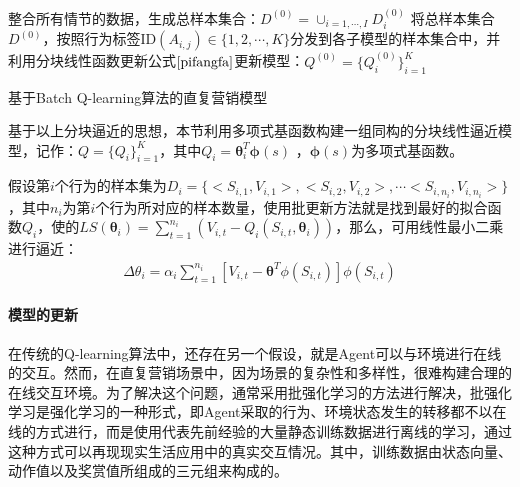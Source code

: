 \begin{algorithm}[htbp]
\small
\SetAlgoLined
{} 

整合所有情节的数据，生成总样本集合：$D^{(0)}=\cup_{i=1,\cdots,I} D_{i}^{(0)}$\;
将总样本集合$D^{(0)}$，按照行为标签ID$(A_{i,j}) \in \{1,2,\cdots, K \}$分发到各子模型的样本集合中，并利用分块线性函数更新公式$\eqref{pifangfa}$更新模型：$Q^{(0)}=\{Q_{i}^{(0)}\}_{i=1}^{K}$\;
\caption{基于Batch Q-learning算法的直复营销模型}
\label{algo:SVR+Q}
\end{algorithm}

基于以上分块逼近的思想，本节利用多项式基函数构建一组同构的分块线性逼近模型，记作：$Q=\{Q_{i}\}_{i=1}^{K}$，其中$Q_{i}=\bm{\theta}_{i}^{T} \bm{\phi}(s)$ ，$\bm{\phi}(s)$为多项式基函数。

假设第$i$个行为的样本集为$D_{i}=\{<S_{i,1},V_{i,1}>, <S_{i,2}, V_{i,2}>, \cdots <S_{i,n_{i}},V_{i,n_{i}}>\}$，其中$n_{i}$为第$i$个行为所对应的样本数量，使用批更新方法就是找到最好的拟合函数$Q_{i}$，使的$LS(\bm{\theta}_{i})=\sum_{t=1}^{n_{i}}(V_{i,t}-Q_{i}(S_{i,t},\bm{\theta}_{i}))$，那么，可用线性最小二乘进行逼近：
\begin{equation}\label{pifangfa}
\begin{aligned}
\Delta \theta_{i} = \alpha_{i} \sum_{t=1}^{n_{i}}[V_{i,t}-\bm{\theta}^{T} \phi(S_{i,t})] \phi(S_{i,t})
\end{aligned}
\end{equation}

\paragraph{模型的更新}
在传统的Q-learning算法中，还存在另一个假设，就是Agent可以与环境进行在线的交互。然而，在直复营销场景中，因为场景的复杂性和多样性，很难构建合理的在线交互环境。为了解决这个问题，通常采用批强化学习\citep{lange2012batch}的方法进行解决，批强化学习是强化学习的一种形式，即Agent采取的行为、环境状态发生的转移都不以在线的方式进行，而是使用代表先前经验的大量静态训练数据进行离线的学习，通过这种方式可以再现现实生活应用中的真实交互情况。其中，训练数据由状态向量、动作值以及奖赏值所组成的三元组来构成的。

